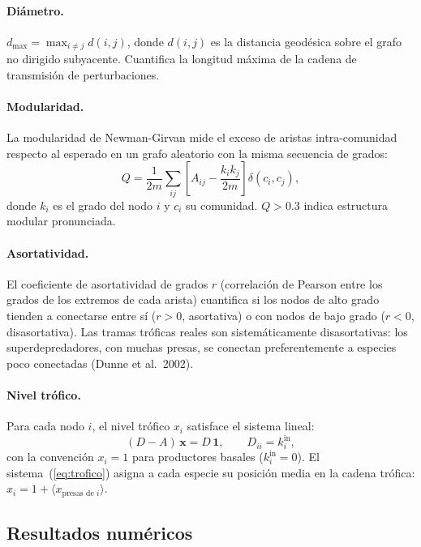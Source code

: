 \documentclass[12pt, a4paper]{article}
\newcommand{\vect}[1]{\boldsymbol{#1}}
\begin{document}
\paragraph{Diámetro.}
$d_{\max} = \max_{i \neq j} d(i,j)$, donde $d(i,j)$ es la distancia geodésica sobre el
grafo no dirigido subyacente. Cuantifica la longitud máxima de la cadena de transmisión
de perturbaciones.

\paragraph{Modularidad.}
La modularidad de Newman-Girvan mide el exceso de aristas intra-comunidad respecto
al esperado en un grafo aleatorio con la misma secuencia de grados:
\begin{equation}
    Q = \frac{1}{2m} \sum_{ij} \left[ A_{ij} - \frac{k_i k_j}{2m} \right]
        \delta(c_i, c_j),
\end{equation}
donde $k_i$ es el grado del nodo $i$ y $c_i$ su comunidad. $Q > 0.3$ indica
estructura modular pronunciada.

\paragraph{Asortatividad.}
El coeficiente de asortatividad de grados $r$ (correlación de Pearson entre los grados
de los extremos de cada arista) cuantifica si los nodos de alto grado tienden a
conectarse entre sí ($r > 0$, asortativa) o con nodos de bajo grado ($r < 0$,
disasortativa). Las tramas tróficas reales son sistemáticamente disasortativas:
los superdepredadores, con muchas presas, se conectan preferentemente a especies
poco conectadas (Dunne et al.\ 2002).

\paragraph{Nivel trófico.}
Para cada nodo $i$, el nivel trófico $x_i$ satisface el sistema lineal:
\begin{equation}
    (D - A)\,\vect{x} = D\,\vect{1},
    \qquad
    D_{ii} = k_i^{\text{in}},
    \label{eq:trofico}
\end{equation}
con la convención $x_i = 1$ para productores basales ($k_i^{\text{in}} = 0$).
El sistema~(\ref{eq:trofico}) asigna a cada especie su posición media en la
cadena trófica: $x_i = 1 + \langle x_{\text{presas de }i} \rangle$.

\subsection{Resultados numéricos}
\end{document}
